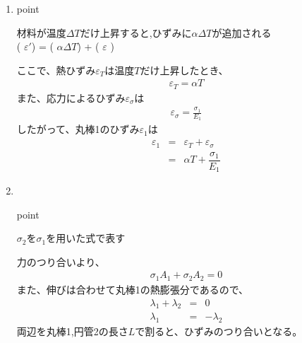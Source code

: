 \documentclass[a4paper]{jsarticle}
\begin{document}
\begin{enumerate}[(1)]
    \item {}
          \begin{itembox}[l]{point}
              \begin{center}
                  材料が温度$\Delta T$だけ上昇すると,ひずみに$\alpha \Delta T$が追加される\\
                  ( $\varepsilon'$) = ( $\alpha \Delta T$) + ( $\varepsilon$ )
              \end{center}
          \end{itembox}
          ここで、熱ひずみ$\varepsilon_T$は温度$T$だけ上昇したとき、
          \begin{eqnarray*}
              \varepsilon_T=\alpha T
          \end{eqnarray*}
          また、応力によるひずみ$\varepsilon_\sigma$は
          \begin{eqnarray*}
              \varepsilon_\sigma=\frac{\sigma_1}{E_1}
          \end{eqnarray*}
          したがって、丸棒1のひずみ$\varepsilon_1$は
          \begin{eqnarray*}
              \varepsilon_1&=&\varepsilon_T+\varepsilon_\sigma\\
              &=&\alpha T+\dfrac{\sigma_1}{E_1}
          \end{eqnarray*}
    \item {}\\
          \begin{itembox}[l]{point}
              \begin{center}
                  $\sigma_2$を$\sigma_1$を用いた式で表す
              \end{center}
          \end{itembox}
          力のつり合いより、
          \begin{eqnarray*}
              \sigma_1A_1+\sigma_2A_2=0
          \end{eqnarray*}
          また、伸びは合わせて丸棒1の熱膨張分であるので、
          \begin{eqnarray*}
              \lambda_1+\lambda_2&=&0\\
              \lambda_1&=&-\lambda_2
          \end{eqnarray*}
          両辺を丸棒1,円管2の長さ$L$で割ると、ひずみのつり合いとなる。

\end{enumerate}
\end{document}

